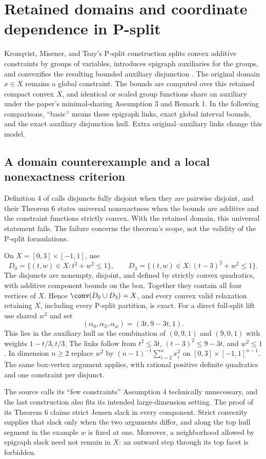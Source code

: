 \section{Retained domains and coordinate dependence in P-split}
\label{app:p-split}
Kronqvist, Misener, and Tsay's P-split construction splits convex additive
constraints by groups of variables, introduces epigraph auxiliaries for
the groups, and convexifies the resulting bounded auxiliary disjunction
\citep[Sections 2--4]{KronqvistEtAl2026}. The original domain $x\in X$
remains a global constraint. The bounds are computed over this retained
compact convex $X$, and identical or scaled group functions share an
auxiliary under the paper's minimal-sharing Assumption 3 and Remark 1.
In the following comparisons, ``basic'' means these epigraph links,
exact global interval bounds, and the exact auxiliary disjunction hull.
Extra original--auxiliary links change this model.

\subsection{A domain counterexample and a local nonexactness criterion}
Definition 4 of \citet{KronqvistEtAl2026} calls disjuncts fully disjoint
when they are pairwise disjoint, and their Theorem 6 states universal
nonexactness when the bounds are additive and the constraint functions
strictly convex. With the retained domain, this universal statement
fails. The failure concerns the theorem's scope, not the validity of the
P-split formulations.

\begin{example}\label{ex:psplit-exact-box}
On $X=[0,3]\times[-1,1]$, use
\[
 D_0=\{(t,w)\in X:t^2+w^2\le1\},\qquad
 D_3=\{(t,w)\in X:(t-3)^2+w^2\le1\}.
\]
The disjuncts are nonempty, disjoint, and defined by strictly convex
quadratics, with additive component bounds on the box. Together they
contain all four vertices of $X$. Hence $\conv(D_0\cup D_3)=X$, and every convex
valid relaxation retaining $X$, including every P-split partition, is exact.
For a direct full-split lift use shared $w^2$ and set
\[
 (\alpha_0,\alpha_3,\alpha_w)=(3t,9-3t,1).
\]
This lies in the auxiliary hull as the combination of $(0,9,1)$ and
$(9,0,1)$ with weights $1-t/3,t/3$. The links follow from
$t^2\le3t$, $(t-3)^2\le9-3t$, and $w^2\le1$. In dimension $n\ge2$
replace $w^2$ by $(n-1)^{-1}\sum_{i=2}^n x_i^2$ on
$[0,3]\times[-1,1]^{n-1}$. The same box-vertex argument applies,
with rational positive definite quadratics and one constraint per disjunct.
\end{example}
The source calls its ``few constraints'' Assumption 4 technically
unnecessary, and the last construction also fits its intended
large-dimension setting. The proof of its Theorem 6 claims strict Jensen
slack in every component. Strict convexity supplies that slack only when
the two arguments differ, and along the top hull segment in the example
$w$ is fixed at one. Moreover, a neighborhood allowed by epigraph slack
need not remain in $X$: an outward step through its top facet is
forbidden.

